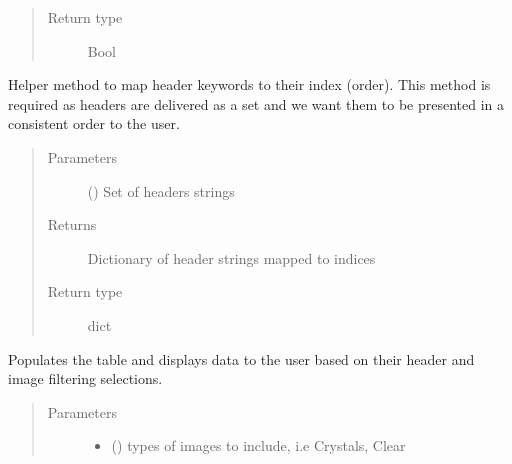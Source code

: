 \documentclass[letterpaper,10pt,english]{sphinxmanual}
\begin{document}
\begin{fulllineitems}
\begin{fulllineitems}
\begin{quote}
\begin{description}
\item[{Return type}] \leavevmode
Bool

\end{description}\end{quote}

\end{fulllineitems}


\begin{fulllineitems}
\label{\detokenize{polo.widgets:polo.widgets.table_viewer.TableViewer.make_header_map}}
Helper method to map header keywords to their index (order). 
This method is required as headers are delivered as a set and 
we want them to be presented in a consistent order to the user.
\begin{quote}\begin{description}
\item[{Parameters}] \leavevmode
{} () \textendash{} Set of headers strings

\item[{Returns}] \leavevmode
Dictionary of header strings mapped to indices

\item[{Return type}] \leavevmode
dict

\end{description}\end{quote}

\end{fulllineitems}


\begin{fulllineitems}
\label{\detokenize{polo.widgets:polo.widgets.table_viewer.TableViewer.populate_table}}
Populates the table and displays data to the user based on their
header and image filtering selections.
\begin{quote}\begin{description}
\item[{Parameters}] \leavevmode\begin{itemize}
\item {} 
 () \textendash{} types of images to include, i.e Crystals, Clear


\end{itemize}
\end{description}
\end{quote}
\end{fulllineitems}
\end{fulllineitems}
\end{document}
